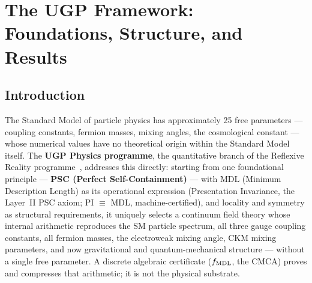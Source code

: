 
\clearpage
\section{The UGP Framework: Foundations, Structure, and Results}
\label{sec:overview}

\subsection{Introduction}
\label{subsec:overview-intro}

The Standard Model of particle physics has approximately 25 free parameters ---
coupling constants, fermion masses, mixing angles, the cosmological constant ---
whose numerical values have no theoretical origin within the Standard Model itself.
The \textbf{UGP Physics programme}, the quantitative branch of the Reflexive Reality programme~\cite{SpivackResearchProgrammes}, addresses this
directly: starting from one foundational principle --- \textbf{PSC (Perfect
Self-Containment)} --- with MDL (Minimum Description Length) as its operational
expression (Presentation Invariance, the Layer~II PSC axiom; PI $\equiv$ MDL,
machine-certified), and locality and symmetry as structural requirements, it
uniquely selects a continuum field theory whose internal arithmetic
reproduces the SM particle spectrum, all three gauge coupling constants, all fermion
masses, the electroweak mixing angle, CKM mixing parameters, and now gravitational
and quantum-mechanical structure --- without a single free parameter.  A discrete
algebraic certificate ($f_{\rm MDL}$, the CMCA) proves and compresses that
arithmetic; it is not the physical substrate.

